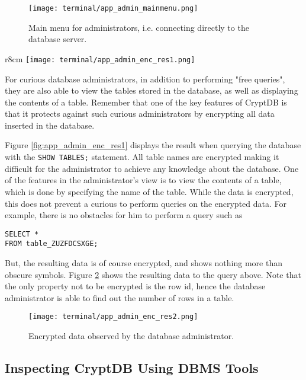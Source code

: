 \begin{figure}[h]
	\centering
	\texttt{[image: terminal/app\_admin\_mainmenu.png]}
	\caption{Main menu for administrators, i.e. connecting directly to the database server.}
	\label{fig:app_mm_admin}
\end{figure}

\begin{wrapfigure}[14]{r}{8cm}
	\centering
    \texttt{[image: terminal/app\_admin\_enc\_res1.png]}
    \caption{Encrypted tables in CryptDB from a database administrator's perspective}
    \label{fig:app_admin_enc_res1}
\end{wrapfigure}
For curious database administrators, in addition to performing "free queries", they are also able to view the tables stored in the database, as well as displaying the contents of a table. Remember that one of the key features of CryptDB is that it protects against such curious administrators by encrypting all data inserted in the database.

Figure \ref{fig:app_admin_enc_res1} displays the result when querying the database with the \verb!SHOW TABLES;! statement. All table names are encrypted making it difficult for the administrator to achieve any knowledge about the database. One of the features in the administrator's view is to view the contents of a table, which is done by specifying the name of the table. While the data is encrypted, this does not prevent a curious to perform queries on the encrypted data. For example, there is no obstacles for him to perform a query such as

\begin{verbatim}
SELECT *
FROM table_ZUZFDCSXGE;
\end{verbatim}

But, the resulting data is of course encrypted, and shows nothing more than obscure symbols. Figure \ref{fig:admin_enc_res2} shows the resulting data to the query above. Note that the only property not to be encrypted is the row id, hence the database administrator is able to find out the number of rows in a table.

\begin{figure}[h]
	\centering
	\texttt{[image: terminal/app\_admin\_enc\_res2.png]}
	\caption{Encrypted data observed by the database administrator.}
	\label{fig:admin_enc_res2}
\end{figure}



\newpage
\subsection{Inspecting CryptDB Using DBMS Tools}


